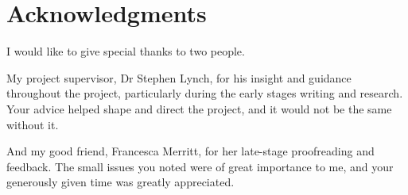 \chapter*{Acknowledgments}

I would like to give special thanks to two people.

My project supervisor, Dr Stephen Lynch, for his insight and guidance throughout
the project, particularly during the early stages writing and research.
Your advice helped shape and direct the project, and it would not be the same
without it.

And my good friend, Francesca Merritt, for her late-stage proofreading and
feedback.
The small issues you noted were of great importance to me, and your generously
given time was greatly appreciated.
